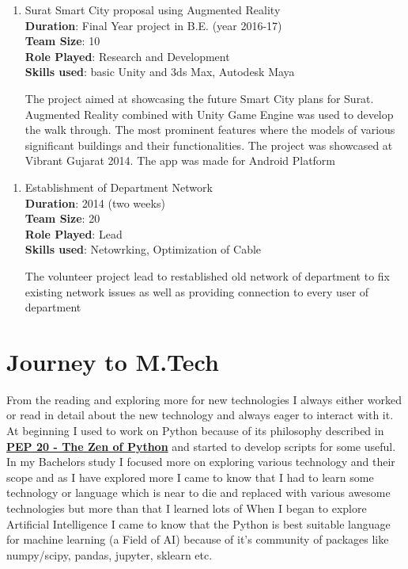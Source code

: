 \documentclass[a4paper, 14pt]{article}
\begin{document}
	\begin{enumerate}[start=1,label={\bfseries $\Rightarrow$ TITLE - }]
		\addtolength{\itemindent}{40pt}
		\item Surat Smart City proposal using Augmented Reality
		\\ \textbf{Duration}: Final Year project in B.E. (year 2016-17)
		\\ \textbf{Team Size}: 10
		\\ \textbf{Role Played}: Research and Development
		\\ \textbf{Skills used}: basic Unity and 3ds Max, Autodesk Maya
		
		The project aimed at showcasing the future Smart City plans for Surat. Augmented Reality combined with Unity Game Engine was used to develop the walk through. The most prominent features where the models of various significant buildings and their functionalities. The project was showcased at Vibrant Gujarat 2014. The app was made for Android Platform
	\end{enumerate}
	

	\begin{enumerate}[start=1,label={\bfseries $\Rightarrow$ TITLE - }]
		\addtolength{\itemindent}{40pt}
		\item Establishment of Department Network
		\\ \textbf{Duration}: 2014 (two weeks)
		\\ \textbf{Team Size}: 20
		\\ \textbf{Role Played}: Lead
		\\ \textbf{Skills used}:  Netowrking, Optimization of Cable
		
		The volunteer project lead to restablished old network of department to fix existing network issues as well as providing connection to every user of department
	\end{enumerate}

	\newpage
	\section*{Journey to M.Tech}
	From the reading and exploring more for new technologies I always either worked or read in detail about the new technology and always eager to interact with it. \\

	At beginning I used to work on Python because of its philosophy described in \href{https://www.python.org/dev/peps/pep-0020/#the-zen-of-python}{\textbf{PEP 20 -  The Zen of Python}} and started to develop scripts for some useful. \\
	In my Bachelors study I focused more on exploring various technology and their scope and as I have explored more I came to know that I had to learn some technology or language which is near to die and replaced with various awesome technologies but more than that I learned lots of 
	When I began to explore Artificial Intelligence I came to know that the Python is best suitable language for machine learning (a Field of AI) because of it's community of packages like numpy/scipy, pandas, jupyter, sklearn etc. \\
	
\end{document}
